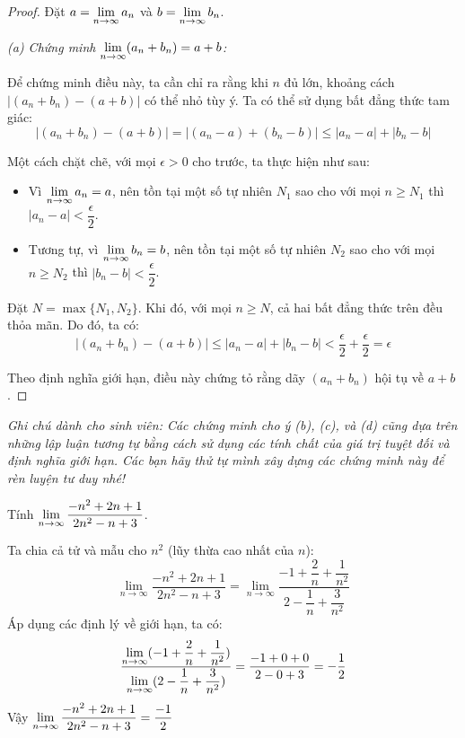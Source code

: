 \begin{proof}
    Đặt $a = \lim\limits_{n \to \infty}a_n$ và $b = \lim\limits_{n \to \infty}b_n$.

    \textit{(a) Chứng minh $\lim\limits_{n \to \infty}(a_n + b_n) = a + b$:}

    Để chứng minh điều này, ta cần chỉ ra rằng khi $n$ đủ lớn, khoảng cách $|(a_n + b_n) - (a+b)|$ có thể nhỏ tùy ý. Ta có thể sử dụng bất đẳng thức tam giác:
    $$|(a_n + b_n) - (a+b)| = |(a_n - a) + (b_n - b)| \le |a_n - a| + |b_n - b|$$

    Một cách chặt chẽ, với mọi $\epsilon > 0$ cho trước, ta thực hiện như sau:
    \begin{itemize}
        \item Vì $\lim\limits_{n \to \infty}a_n = a$, nên tồn tại một số tự nhiên $N_1$ sao cho với mọi $n \ge N_1$ thì $|a_n - a| < \dfrac{\epsilon}{2}$.
        \item Tương tự, vì $\lim\limits_{n \to \infty}b_n = b$, nên tồn tại một số tự nhiên $N_2$ sao cho với mọi $n \ge N_2$ thì $|b_n - b| < \dfrac{\epsilon}{2}$.
    \end{itemize}

    Đặt $N = \max\{N_1, N_2\}$. Khi đó, với mọi $n \ge N$, cả hai bất đẳng thức trên đều thỏa mãn. Do đó, ta có:
    \[ |(a_n + b_n) - (a+b)| \le |a_n - a| + |b_n - b| < \dfrac{\epsilon}{2} + \dfrac{\epsilon}{2} = \epsilon \]

    Theo định nghĩa giới hạn, điều này chứng tỏ rằng dãy $(a_n + b_n)$ hội tụ về $a + b$.
\end{proof}

\textit{Ghi chú dành cho sinh viên: Các chứng minh cho ý (b), (c), và (d) cũng dựa trên những lập luận tương tự bằng cách sử dụng các tính chất của giá trị tuyệt đối và định nghĩa giới hạn. Các bạn hãy thử tự mình xây dựng các chứng minh này để rèn luyện tư duy nhé!}

\begin{example}
Tính $\lim\limits_{n \to \infty} \dfrac{-n^2 + 2n + 1}{2n^2 - n + 3}$.
\begin{solution}
Ta chia cả tử và mẫu cho $n^2$ (lũy thừa cao nhất của $n$):
\[ \lim_{n \to \infty} \dfrac{-n^2 + 2n + 1}{2n^2 - n + 3} = \lim_{n \to \infty} \dfrac{-1 + \dfrac{2}{n} + \dfrac{1}{n^2}}{2 - \dfrac{1}{n} + \dfrac{3}{n^2}} \]
Áp dụng các định lý về giới hạn, ta có:
\[ \dfrac{\lim\limits_{n \to \infty} (-1 + \dfrac{2}{n} + \dfrac{1}{n^2})}{\lim\limits_{n \to \infty} (2 - \dfrac{1}{n} + \dfrac{3}{n^2})} = \dfrac{-1 + 0 + 0}{2 - 0 + 3} = -\dfrac{1}{2}\]
Vậy $\lim\limits_{n \to \infty} \dfrac{-n^2 + 2n + 1}{2n^2 - n + 3} = \dfrac{-1}{2}$
\end{solution}
\end{example}

